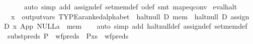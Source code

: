 \begin{isabellebody}
\ \ \ \ \isamarkupfalse%
\ {}auto\ simp\ add{}\ assign{}def\ set{}mem{}def\ o{}def{}\ smt\ map{}eq{}conv{}\isanewline
{}\isamarkupfalse%
%
\endisatagproof
{\isafoldproof}%
%
\isadelimproof
\isanewline
%
\endisadelimproof
\isanewline
{}\isamarkupfalse%
\ eval{}halt{}\isanewline
\ \ {}x\ {}\ output{}vars\ TYPE{}{}a{}{}ranked{}alphabet{}\ {}\ halt{}null\ D\ mem\ {}\ halt{}null\ D\ {}assign\ D\ x\ {}App\ {}NULL{}{}{}a{}\ {}{}{}\ mem{}{}\isanewline
%
\isadelimproof
\ \ %
\endisadelimproof
%
\isatagproof
{}\isamarkupfalse%
\ {}auto\ simp\ add{}\ halt{}null{}def\ assign{}def\ set{}mem{}def{}%
\endisatagproof
{\isafoldproof}%
%
\isadelimproof
\isanewline
%
\endisadelimproof
\isanewline
{}\isamarkupfalse%
\ subst{}preds{}\ {}P\ {}\ wf{}preds\ {}\ P{}x{}s{}\ {}\ wf{}preds{}\isanewline

\end{isabellebody}
